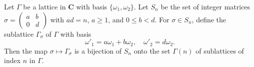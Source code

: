 Let $\Gamma$ be a lattice in $\mathbf{C}$ with basis $\{\omega_1, \omega_2\}$. Let $S_n$ be the set of integer matrices $\sigma = \begin{pmatrix} a & b \\ 0 & d \end{pmatrix}$ with $ad = n$, $a \geq 1$, and $0 \leq b < d$. For $\sigma \in S_n$, define the sublattice $\Gamma_\sigma$ of $\Gamma$ with basis
$$\omega'_1 = a\omega_1 + b\omega_2, \quad \omega'_2 = d\omega_2.$$
Then the map $\sigma \mapsto \Gamma_\sigma$ is a bijection of $S_n$ onto the set $\Gamma(n)$ of sublattices of index $n$ in $\Gamma$.
